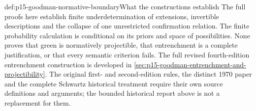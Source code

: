 \begin{proofboundary}{def:p15-goodman-normative-boundary}{What the constructions establish}
The full proofs here establish finite underdetermination of extensions,
invertible descriptions and the collapse of one unrestricted confirmation
relation. The finite probability calculation is conditional on its priors
and space of possibilities. None proves that green is normatively
projectible, that entrenchment is a complete justification, or that every
semantic criterion fails. The full revised fourth-edition entrenchment
construction is developed in
\cref{sec:p15-goodman-entrenchment-and-projectibility}. The original
first- and second-edition rules, the distinct 1970 paper and the complete
Schwartz historical treatment require their own source definitions and
arguments; the bounded historical report above is not a replacement for them.
\end{proofboundary}

